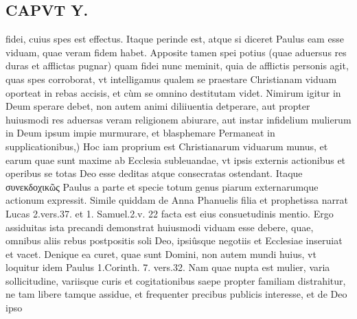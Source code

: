 \documentclass{article}
\begin{document}
\begin{pages}
\section*{CAPVT  Y. }
\marginpar{[ p.29 ]}\pstart fidei, cuius spes est effectus. Itaque perinde est, atque  si diceret Paulus eam esse viduam, quae veram fidem habet. Apposite tamen spei potius (quae aduersus res duras et afflictas pugnar) quam fidei nunc meminit, quia de afflictis personis agit, quas spes corroborat, vt intelligamus qualem se praestare Christianam viduam oporteat in rebas accisis, et cùm se omnino destitutam videt. Nimirum igitur in Deum sperare debet, non autem animi diliiuentia detperare, aut propter huiusmodi res aduersas veram religionem abiurare, aut instar infidelium mulierum in Deum ipsum impie murmurare, et blasphemare  \pend\pstart Permaneat in supplicationibus,) Hoc iam proprium est Christianarum viduarum munus, et earum quae sunt maxime ab Ecclesia subleuandae, vt ipsis externis actionibus et operibus se totas Deo esse deditas atque consecratas ostendant. Itaque συνεκδοχικῶς Paulus a parte et specie totum genus piarum externarumque actionum expressit. Simile quiddam de Anna Phanuelis filia et prophetissa narrat Lucas 2.vers.37. et 1. Samuel.2.v. 22 facta est eius consuetudinis mentio. Ergo assiduitas ista precandi demonstrat huiusmodi viduam esse debere, quae, omnibus aliis rebus postpositis soli Deo, ipsiûsque negotiis et Ecclesiae inseruiat et vacet. Denique ea curet, quae sunt Domini, non autem mundi huius, vt loquitur idem Paulus 1.Corinth. 7. vers.32. Nam quae nupta est mulier, varia sollicitudine, variisque curis et cogitationibus saepe propter familiam distrahitur, ne tam libere tamque assidue, et frequenter precibus publicis interesse, et de Deo ipso  \pend

\end{pages}
\end{document}
